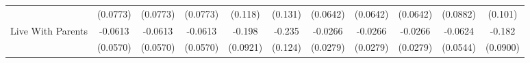 {\begin{tabular}{l*{10}{c}}
            &    (0.0773)         &    (0.0773)         &    (0.0773)         &     (0.118)         &     (0.131)         &    (0.0642)         &    (0.0642)         &    (0.0642)         &    (0.0882)         &     (0.101)         \\
\addlinespace
Live With Parents&     -0.0613         &     -0.0613         &     -0.0613         &      -0.198\sym{*}  &      -0.235         &     -0.0266         &     -0.0266         &     -0.0266         &     -0.0624         &      -0.182\sym{*}  \\
            &    (0.0570)         &    (0.0570)         &    (0.0570)         &    (0.0921)         &     (0.124)         &    (0.0279)         &    (0.0279)         &    (0.0279)         &    (0.0544)         &    (0.0900)         \\
\bottomrule
\end{tabular}
}
